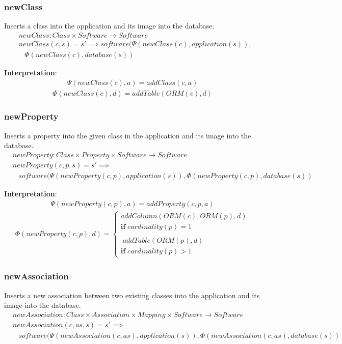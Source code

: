 \documentclass[10pt]{article}
\begin{document}
\subsubsection{newClass}
Inserts a class into the application and its image into the database.
\begin{align}
& newClass: Class \times Software \rightarrow Software \\
& newClass(c, s) = s' \implies software(\Psi(newClass(c), application(s)), \nonumber \\
& \;\;\; \Phi(newClass(c), database(s))
\end{align}

\noindent \textbf{Interpretation}:
\begin{align}
\Psi(newClass(c), a) = addClass(c, a)
\end{align}
\begin{align}
\Phi(newClass(c), d) = addTable(ORM(c),  d)
\end{align}


\subsubsection{newProperty}
Inserts a property into the given class in the application and its image into the database.
\begin{align}
& newProperty: Class \times Property \times Software \rightarrow Software \\
& newProperty(c, p, s) = s' \implies \nonumber \\ 
& \;\;\; software(\Psi(newProperty(c, p), application(s)), \Phi(newProperty(c,p), database(s))
\end{align}

\noindent \textbf{Interpretation}:
\begin{align}
\Psi(newProperty(c, p), a) = addProperty(c, p, a)
\end{align}
\begin{align}
\Phi(newProperty(c, p), d) = \begin{cases}
  addColumn(ORM(c), ORM(p),  d) \\ \mathbf{if} \; cardinality(p) = 1  \\\\ 
  \; addTable(ORM(p),  d) \\
  \mathbf{if} \; cardinality(p) > 1  
   \end{cases}
\end{align}


\subsubsection{newAssociation}
Inserts a new association between two existing classes into the application and its image into the database.
\begin{align}
& newAssociation: Class \times Association \times Mapping \times Software \rightarrow Software \\
& newAssociation(c, as, s) = s' \implies \nonumber \\ 
& \;\;\; software(\Psi(newAssociation(c, as), application(s)), \Phi(newAssociation(c, as), database(s))
\end{align}
\end{document}
